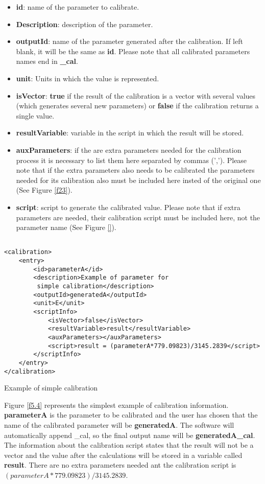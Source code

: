\begin{itemize}
\item \textbf{id}: name of the parameter to calibrate.
\item \textbf{Description}: description of the parameter.
\item \textbf{outputId}: name of the parameter generated after the calibration. If left blank, it will be the same as \textbf{id}. Please note that all calibrated parameters names end in \textbf{\_cal}.
\item \textbf{unit}: Units in which the value is represented.
\item \textbf{isVector}: \textbf{true} if the result of the calibration is a vector with several values (which generates several new parameters) or \textbf{false} if the calibration returns a single value.
\item \textbf{resultVariable}: variable in the script in which the result will be stored.
\item \textbf{auxParameters}: if the are extra parameters needed for the calibration process it is necessary to list them here separated by commas (','). Please note that if the extra parameters also needs to be calibrated the parameters needed for its calibration also must be included here insted of the original one (See Figure \ref{f23}).
\item \textbf{script}: script to generate the calibrated value. Please note that if extra parameters are needed, their calibration script must be included here, not the parameter name (See Figure \ref{}). 
\end{itemize}



\begin{table}[H]
\lstset{language=XML}
\begin{lstlisting}

<calibration>
	<entry>
		<id>parameterA</id>
		<description>Example of parameter for
		 simple calibration</description>
		<outputId>generatedA</outputId> 
		<unit>E</unit>
		<scriptInfo>
			<isVector>false</isVector>
			<resultVariable>result</resultVariable>
			<auxParameters></auxParameters>
			<script>result = (parameterA*779.09823)/3145.2839</script>
		</scriptInfo>
	</entry>
</calibration>
\end{lstlisting}
\caption{Example of simple calibration}
\label{Table5.2}
\end{table}

Figure \ref{f5.4} represents the simplest example of calibration information. \textbf{parameterA} is the parameter to be calibrated and the user has chosen that the name of the calibrated parameter will be \textbf{generatedA}. The software will automatically append  \_cal, so the final output name will be \textbf{generatedA\_cal}. The information about the calibration script states that the result will not be a vector and the value after the calculations will be stored in a variable called \textbf{result}. There are no extra parameters needed ant the calibration script is $(parameterA*779.09823)/3145.2839$.

